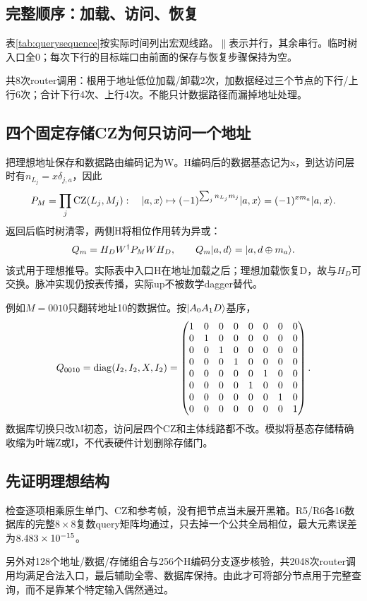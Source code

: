 \subsection{完整顺序：加载、访问、恢复}
表\ref{tab:querysequence}按实际时间列出宏观线路。$\parallel$表示并行，其余串行。临时树入口全0；每次下行的目标端口由前面的保存与恢复步骤保持为空。

共8次router调用：根用于地址低位加载/卸载2次，加数据经过三个节点的下行/上行6次；合计下行4次、上行4次。不能只计数据路径而漏掉地址处理。

\subsection{四个固定存储CZ为何只访问一个地址}
把理想地址保存和数据路由编码记为W。H编码后的数据基态记为x，到达访问层时有$n_{L_j}=x\delta_{j,a}$，因此
\begin{equation}\label{eq:memoryphase}
 P_M=\prod_j\mathrm{CZ}(L_j,M_j):\quad
 \lvert a,x\rangle\mapsto(-1)^{\sum_jn_{L_j}m_j}\lvert a,x\rangle=(-1)^{xm_a}\lvert a,x\rangle.
\end{equation}
返回后临时树清零，两侧H将相位作用转为异或：
\begin{equation}\label{eq:queryconstruction}
 Q_m=H_DW^\dagger P_MWH_D,\qquad Q_m\lvert a,d\rangle=\lvert a,d\oplus m_a\rangle.
\end{equation}
该式用于理想推导。实际表中入口H在地址加载之后；理想加载恢复D，故与$H_D$可交换。脉冲实现仍按表传播，实际up不被数学dagger替代。

例如$M=0010$只翻转地址10的数据位。按$\lvert A_0A_1D\rangle$基序，
\begin{equation}\label{eq:matrixexample}
 Q_{0010}=\operatorname{diag}(I_2,I_2,X,I_2)=
 \begin{pmatrix}
1&0&0&0&0&0&0&0\\0&1&0&0&0&0&0&0\\0&0&1&0&0&0&0&0\\0&0&0&1&0&0&0&0\\
0&0&0&0&0&1&0&0\\0&0&0&0&1&0&0&0\\0&0&0&0&0&0&1&0\\0&0&0&0&0&0&0&1
\end{pmatrix}.
\end{equation}
数据库切换只改M初态，访问层四个CZ和主体线路都不改。模拟将基态存储精确收缩为叶端Z或I，不代表硬件计划删除存储门。

\subsection{先证明理想结构}
检查逐项相乘原生单门、CZ和参考帧，没有把节点当未展开黑箱。R5/R6各16数据库的完整$8\times8$复数query矩阵均通过，只去掉一个公共全局相位，最大元素误差为$8.483\times10^{-15}$。

另外对128个地址/数据/存储组合与256个H编码分支逐步核验，共2048次router调用均满足合法入口，最后辅助全零、数据库保持。由此才可将部分节点用于完整查询，而不是靠某个特定输入偶然通过。
\FloatBarrier
